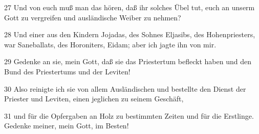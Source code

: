 \par 27 Und von euch muß man das hören, daß ihr solches Übel tut, euch an unserm Gott zu vergreifen und ausländische Weiber zu nehmen?
\par 28 Und einer aus den Kindern Jojadas, des Sohnes Eljasibs, des Hohenpriesters, war Saneballats, des Horoniters, Eidam; aber ich jagte ihn von mir.
\par 29 Gedenke an sie, mein Gott, daß sie das Priestertum befleckt haben und den Bund des Priestertums und der Leviten!
\par 30 Also reinigte ich sie von allem Ausländischen und bestellte den Dienst der Priester und Leviten, einen jeglichen zu seinem Geschäft,
\par 31 und für die Opfergaben an Holz zu bestimmten Zeiten und für die Erstlinge. Gedenke meiner, mein Gott, im Besten!

